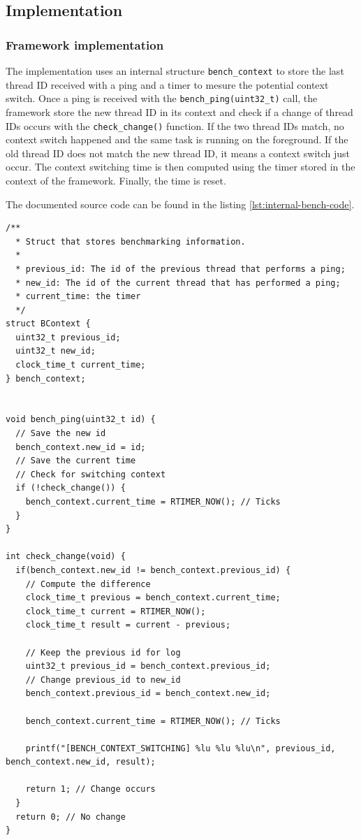 \subsection{Implementation}

\subsubsection{Framework implementation}
The implementation uses an internal structure \texttt{bench\_context} to store the last thread ID received with a ping and a timer to mesure the potential context switch.
Once a ping is received with the \texttt{bench\_ping(uint32\_t)} call, the framework store the new thread ID in its context and check if a change of thread IDs occurs with the \texttt{check\_change()} function.
If the two thread IDs match, no context switch happened and the same task is running on the foreground.
If the old thread ID does not match the new thread ID, it means a context switch just occur.
The context switching time is then computed using the timer stored in the context of the framework.
Finally, the time is reset.

The documented source code can be found in the listing \ref{lst:internal-bench-code}.

\begin{lstlisting}[float, style=CStyle, label={lst:internal-bench-code}, caption={Source code of the benchmarking framework implemented in Contiki}]
/**
  * Struct that stores benchmarking information.
  * 
  * previous_id: The id of the previous thread that performs a ping;
  * new_id: The id of the current thread that has performed a ping;
  * current_time: the timer
  */
struct BContext {
  uint32_t previous_id;
  uint32_t new_id;
  clock_time_t current_time;
} bench_context;


void bench_ping(uint32_t id) {
  // Save the new id
  bench_context.new_id = id;
  // Save the current time
  // Check for switching context
  if (!check_change()) {
    bench_context.current_time = RTIMER_NOW(); // Ticks
  }
}

int check_change(void) {
  if(bench_context.new_id != bench_context.previous_id) {
    // Compute the difference
    clock_time_t previous = bench_context.current_time;
    clock_time_t current = RTIMER_NOW();
    clock_time_t result = current - previous;

    // Keep the previous id for log
    uint32_t previous_id = bench_context.previous_id;
    // Change previous_id to new_id
    bench_context.previous_id = bench_context.new_id;

    bench_context.current_time = RTIMER_NOW(); // Ticks

    printf("[BENCH_CONTEXT_SWITCHING] %lu %lu %lu\n", previous_id, bench_context.new_id, result);
    
    return 1; // Change occurs
  }
  return 0; // No change
}
\end{lstlisting}

